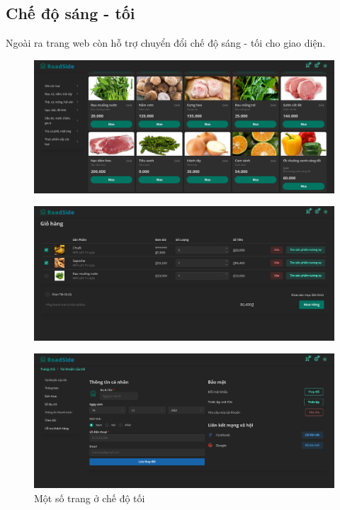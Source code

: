 \subsection{Chế độ sáng - tối}
Ngoài ra trang web còn hỗ trợ chuyển đổi chế độ sáng - tối cho giao diện.
\begin{figure}[H]
    \centering
    \includegraphics[width=0.95\linewidth] {Images/UI/darkmode1.png}
\end{figure}
\begin{figure}[H]
    \centering
    \includegraphics[width=0.95\linewidth] {Images/UI/darkmode2.png}
\end{figure}
\begin{figure}[H]
    \centering
    \includegraphics[width=0.95\linewidth] {Images/UI/darkmode3.png}
    \vspace{1em}
    \caption{Một số trang ở chế độ tối}
\end{figure}